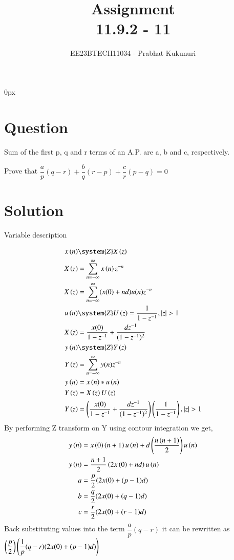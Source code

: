 \documentclass[journal,12pt,twocolumn]{IEEEtran}
\theoremstyle{remark}
\begin{document}
\parindent 0px


\vspace{3cm}

\title{Assignment\\[1ex]11.9.2 - 11}
\author{EE23BTECH11034 - Prabhat Kukunuri$^{}$%
}
\maketitle
\newpage
\bigskip

\renewcommand{\thefigure}{\theenumi}
\renewcommand{\thetable}{\theenumi}
\section*{Question}
Sum of the first p, q and r terms of an A.P. are a, b and c, respectively.

Prove that $\dfrac{a}{p}(q-r)+\dfrac{b}{q}(r-p)+\dfrac{c}{r}(p-q)=0$
\section*{Solution}
\begin{table}[h]
    \centering
    
    \caption{Variable description}
    \label{tab:11.9.2.11.1}
\end{table}
\begin{align}
	x \brak{n} &\system{Z} X \brak{z} \\
    X \brak{z} &= \sum_{n=-\infty}^{\infty} x \brak{n}   z^{-n}\\
    X \brak{z} & = \sum_{n=-\infty}^{\infty}(x(0)+nd)u(n)z^{-n}\\
    u \brak{n} &\system{Z} U \brak{z} = \dfrac{1}{1-z^{-1}}, |z|>1\\
    X \brak{z} & = \dfrac{x(0)}{1-z^{-1}} + \dfrac{dz^{-1}}{(1-z^{-1})^{2}}\\
    y \brak{n} &\system{Z} Y \brak{z}\\
    Y\brak{z}&=\sum_{n=-\infty}^{\infty}y(n)z^{-n}\\
    y\brak{n}&=x\brak{n}\ast u\brak{n}\\
    Y\brak{z}&=X\brak{z}U\brak{z}\\
    Y\brak{z}&=\brak{\dfrac{x(0)}{1-z^{-1}} + \dfrac{dz^{-1}}{(1-z^{-1})^{2}}}\brak{\dfrac{1}{1-z^{-1}}}, |z|>1
 \end{align}
 By performing Z transform on Y using contour integration we get,
\begin{align}
    y\left(n\right)&=x\left(0\right)\left(n+1\right)u\left(n\right)+d\left(\dfrac{{n\left(n+1\right)}}{2}\right)u\left(n\right)\\
    y\left(n\right)&=\dfrac{n+1}{2}\left(2x\left(0\right)+nd\right)u\left(n\right)\\
    a&=\dfrac{p}{2}(2x(0)+(p-1)d)\\
    b&=\dfrac{q}{2}(2x(0)+(q-1)d)\\
    c&=\dfrac{r}{2}(2x(0)+(r-1)d)
\end{align}
Back substituting values into the term $\dfrac{a}{p}(q-r)$ it can be rewritten as $\left(\dfrac{p}{2}\right)\left(\dfrac{1}{p}(q-r)(2x(0)+(p-1)d)\right)$
\end{document}
